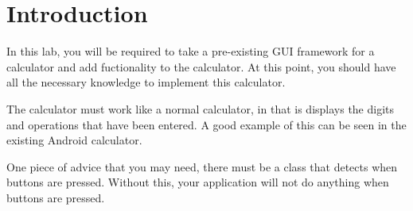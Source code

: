 \section{Introduction}

In this lab, you will be required to take a pre-existing GUI framework for a calculator and add fuctionality to the calculator. At this point, you should have all the necessary knowledge to implement this calculator. 

The calculator must work like a normal calculator, in that is displays the digits and operations that have been entered. A good example of this can be seen in the existing Android calculator.

One piece of advice that you may need, there must be a class that detects when buttons are pressed. Without this, your application will not do anything when buttons are pressed.
